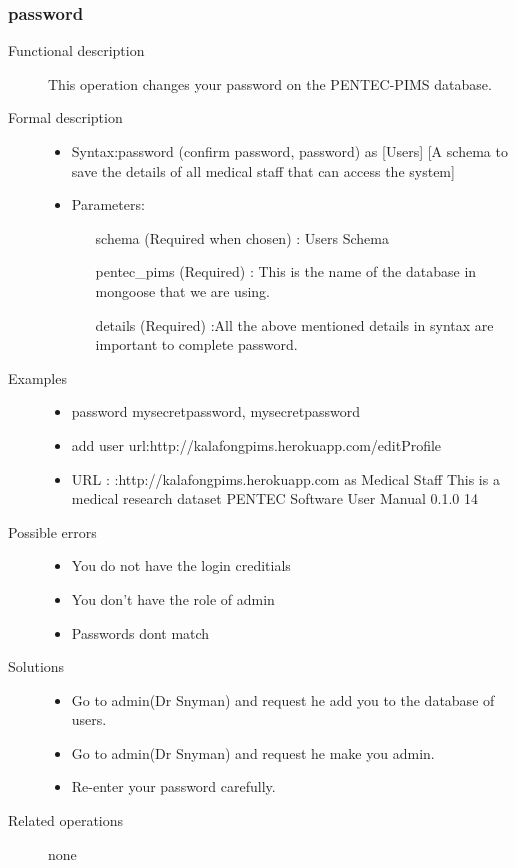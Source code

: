 \documentclass[14pt, a4paper]{article}
\begin{document}
\subsubsection{password}
\begin{description}
\item[Functional description] This operation changes your password on the PENTEC-PIMS database.
\item[Formal description]\hfill
\begin{itemize}
	\item Syntax:password (confirm password, password) as [Users] [A schema to save the details of all medical staff that can access the system]\\
	\item Parameters:
	\begin{itemize}
		\item [schema] (Required when chosen) : Users Schema
		\item [pentec\_pims] (Required) : This is the name of the database in mongoose that we are using.
		\item [details] (Required) :All the above mentioned details in syntax are important to complete password.
	\end{itemize}
\end{itemize}

\item[Examples]\hfill
\begin{itemize}
	\item password mysecretpassword, mysecretpassword
	\item add user url:http://kalafongpims.herokuapp.com/editProfile
	\item URL : :http://kalafongpims.herokuapp.com as Medical Staff This is a medical research dataset
	PENTEC Software User Manual 0.1.0 14
\end{itemize}
\item[Possible errors]\hfill
\begin{itemize}
	\item You do not have the login creditials
	\item You don't have the role of admin
	\item Passwords dont match
\end{itemize}
\item[Solutions]\hfill
\begin{itemize}
	\item Go to admin(Dr Snyman) and request he add you to the database of users.
	\item  Go to admin(Dr Snyman) and request he make you admin.
	\item Re-enter your password carefully.
\end{itemize}
\item[Related operations] none
\end{description}
\end{document}
